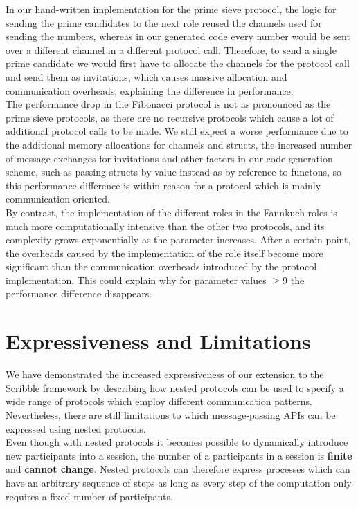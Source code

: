 \documentclass[12pt,twoside]{report}
\begin{document}
In our hand-written implementation for the prime sieve protocol, the logic for sending the prime candidates to the next role reused the channels used for sending the numbers, whereas in our generated code every number would be sent over a different channel in a different protocol call. Therefore, to send a single prime candidate we would first have to allocate the channels for the protocol call and send them as invitations, which causes massive allocation and communication overheads, explaining the difference in performance. \\

The performance drop in the Fibonacci protocol is not as pronounced as the prime sieve protocols, as there are no recursive protocols which cause a lot of additional protocol calls to be made. We still expect a worse performance due to the additional memory allocations for channels and structs, the increased number of message exchanges for invitations and other factors in our code generation scheme, such as passing structs by value instead as by reference to functons, so this performance difference is within reason for a protocol which is mainly communication-oriented.\\

By contrast, the implementation of the different roles in the Fannkuch roles is much more computationally intensive than the other two protocols, and its complexity grows exponentially as the parameter increases. After a certain point, the overheads caused by the implementation of the role itself become more significant than the communication overheads introduced by the protocol implementation. This could explain why for parameter values $\geq 9$ the performance difference disappears.

\section{Expressiveness and Limitations}

We have demonstrated the increased expressiveness of our extension to the Scribble framework by describing how nested protocols can be used to specify a wide range of protocols which employ different communication patterns. Nevertheless, there are still limitations to which message-passing APIs can be expressed using nested protocols.\\

Even though with nested protocols it becomes possible to dynamically introduce new participants into a session, the number of a participants in a session is \textbf{finite} and \textbf{cannot change}. Nested protocols can therefore express processes which can have an arbitrary sequence of steps as long as every step of the computation only requires a fixed number of participants. \\
\end{document}
